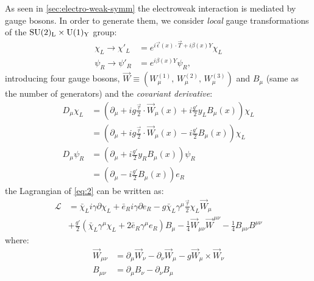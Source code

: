 As seen in \cref{sec:electro-weak-symm} the electroweak interaction is mediated
by gauge bosons. In order to generate them, we consider \emph{local} gauge
transformations of the $\mathrm{SU}(2)_\mathrm{L} \times \mathrm{U}(1)_\mathrm{Y}$ group:
\begin{equation}
  \label{eq:11}
  \begin{split}
    \chi_{L} \rightarrow \chi'_{L} &= e^{i \vec\epsilon(x) \cdot \vec T
      + i \beta(x) Y} \chi_{L} \\
    \psi_{R} \to \psi'_{R} &= e^{i \beta(x) Y} \psi_{R},
  \end{split}
\end{equation}
introducing four gauge bosons,
$\overrightarrow{W} \equiv \left(W_{\mu}^{(1)}, \, W_{\mu}^{(2)}, \,
  W_{\mu}^{(3)} \right)$ and $B_{\mu}$ (same as the number of generators) and
the \emph{covariant derivative}:
\begin{equation}
  \label{eq:12}
  \begin{split}
    D_{\mu} \chi_{L} &= \left( \partial_{\mu} + i g \frac{\vec \tau}{2} \cdot
      \overrightarrow{W}_{\mu}(x) + i \frac{g'}{2} y_{L} B_{\mu}(x) \right)
    \chi_{L} \\
    &= \left( \partial_{\mu} + i g \frac{\vec \tau}{2} \cdot
      \overrightarrow{W}_{\mu}(x) - i \frac{g'}{2} B_{\mu}(x) \right)
    \chi_{L} \\
    D_{\mu} \psi_{R} &= \left( \partial_{\mu} + i \frac{g'}{2} y_{R} B_{\mu}(x)
    \right) \psi_{R} \\
    &= \left( \partial_{\mu} - i \frac{g'}{2} B_{\mu}(x) \right) e_{R}
  \end{split}
\end{equation}
the Lagrangian of \cref{eq:2} can be written as:
\begin{equation}
  \label{eq:13}
  \begin{aligned}
    \mathcal{L} &= \bar{\chi}_{L} i \gamma \partial \chi_{L} +
    \bar{e}_{R} i \gamma \partial e_{R} - g \bar{\chi}_{L} \gamma^{\mu}
    \frac{\vec{\tau}}{2}
    \chi_{L} \overrightarrow{W}_{\mu} \\
    & + \frac{g'}{2} (\bar{\chi}_{L} \gamma^{\mu} \chi_{L} + 2 \bar{e}_{R}
    \gamma^{\mu} e_{R}) B_{\mu} - \frac{1}{4} \overrightarrow{W}_{\mu\nu}
    \overrightarrow{W}^{\mu\nu} - \frac{1}{4} B_{\mu\nu}B^{\mu\nu}
  \end{aligned}
\end{equation}
where:
\begin{equation}
  \label{eq:14}
  \begin{aligned}
    \overrightarrow{W}_{\mu\nu} &= \partial_{\mu} \overrightarrow{W}_{\nu}
    - \partial_{\nu} \overrightarrow{W}_{\mu}
    - g \overrightarrow{W}_{\mu} \times \overrightarrow{W}_{\nu} \\
    B_{\mu\nu} &= \partial_{\mu} B_{\nu} - \partial_{\nu} B_{\mu}
  \end{aligned}
\end{equation}
